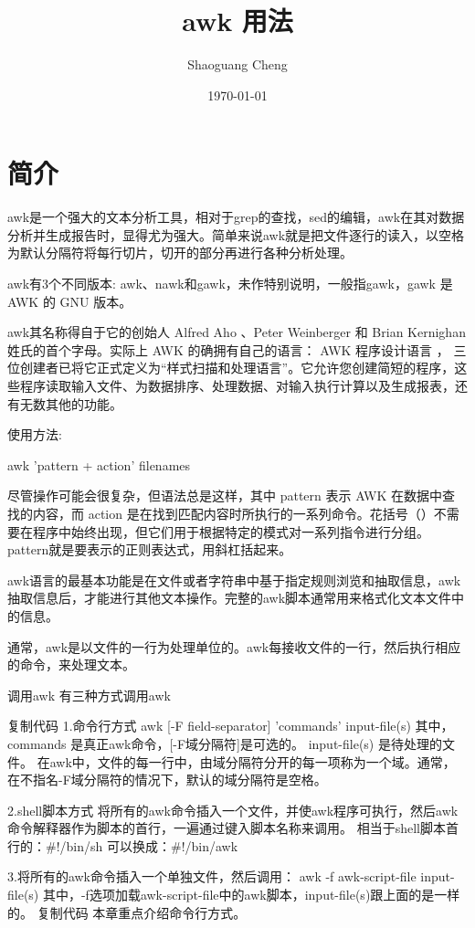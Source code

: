 \documentclass[12pt]{article}
\title{awk 用法}
\author{Shaoguang Cheng}
\date{\today}
\begin{document}
\maketitle

\section{简介}
awk是一个强大的文本分析工具，相对于grep的查找，sed的编辑，awk在其对数据分析并生成报告时，显得尤为强大。简单来说awk就是把文件逐行的读入，以空格为默认分隔符将每行切片，切开的部分再进行各种分析处理。


awk有3个不同版本: awk、nawk和gawk，未作特别说明，一般指gawk，gawk 是 AWK 的 GNU 版本。


awk其名称得自于它的创始人 Alfred Aho 、Peter Weinberger 和 Brian Kernighan 姓氏的首个字母。实际上 AWK 的确拥有自己的语言： AWK 程序设计语言 ， 三位创建者已将它正式定义为“样式扫描和处理语言”。它允许您创建简短的程序，这些程序读取输入文件、为数据排序、处理数据、对输入执行计算以及生成报表，还有无数其他的功能。

 
使用方法: 
\begin{listings}[languages=shell]
awk '{pattern + action}' {filenames}
\end{listings}
尽管操作可能会很复杂，但语法总是这样，其中 pattern 表示 AWK 在数据中查找的内容，而 action 是在找到匹配内容时所执行的一系列命令。花括号（{}）不需要在程序中始终出现，但它们用于根据特定的模式对一系列指令进行分组。 pattern就是要表示的正则表达式，用斜杠括起来。

awk语言的最基本功能是在文件或者字符串中基于指定规则浏览和抽取信息，awk抽取信息后，才能进行其他文本操作。完整的awk脚本通常用来格式化文本文件中的信息。

通常，awk是以文件的一行为处理单位的。awk每接收文件的一行，然后执行相应的命令，来处理文本。

 

调用awk
有三种方式调用awk

复制代码
1.命令行方式
awk [-F  field-separator]  'commands'  input-file(s)
其中，commands 是真正awk命令，[-F域分隔符]是可选的。 input-file(s) 是待处理的文件。
在awk中，文件的每一行中，由域分隔符分开的每一项称为一个域。通常，在不指名-F域分隔符的情况下，默认的域分隔符是空格。

2.shell脚本方式
将所有的awk命令插入一个文件，并使awk程序可执行，然后awk命令解释器作为脚本的首行，一遍通过键入脚本名称来调用。
相当于shell脚本首行的：#!/bin/sh
可以换成：#!/bin/awk

3.将所有的awk命令插入一个单独文件，然后调用：
awk -f awk-script-file input-file(s)
其中，-f选项加载awk-script-file中的awk脚本，input-file(s)跟上面的是一样的。
复制代码
 本章重点介绍命令行方式。
\end{document}
